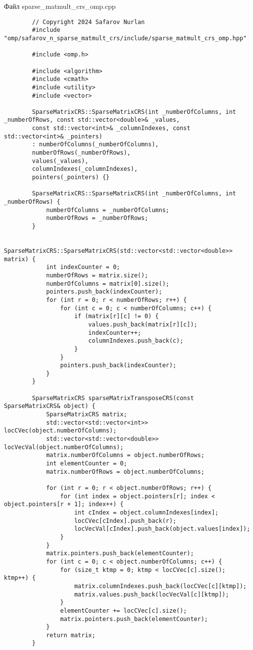 \documentclass[a4paper, 14pt]{article}
\begin{document}
	Файл sparse\_matmult\_crs\_omp.cpp
	\begin{verbatim}
		// Copyright 2024 Safarov Nurlan
		#include "omp/safarov_n_sparse_matmult_crs/include/sparse_matmult_crs_omp.hpp"
		
		#include <omp.h>
		
		#include <algorithm>
		#include <cmath>
		#include <utility>
		#include <vector>
		
		SparseMatrixCRS::SparseMatrixCRS(int _numberOfColumns, int _numberOfRows, const std::vector<double>& _values,
		const std::vector<int>& _columnIndexes, const std::vector<int>& _pointers)
		: numberOfColumns(_numberOfColumns),
		numberOfRows(_numberOfRows),
		values(_values),
		columnIndexes(_columnIndexes),
		pointers(_pointers) {}
		
		SparseMatrixCRS::SparseMatrixCRS(int _numberOfColumns, int _numberOfRows) {
			numberOfColumns = _numberOfColumns;
			numberOfRows = _numberOfRows;
		}
		
		SparseMatrixCRS::SparseMatrixCRS(std::vector<std::vector<double>> matrix) {
			int indexCounter = 0;
			numberOfRows = matrix.size();
			numberOfColumns = matrix[0].size();
			pointers.push_back(indexCounter);
			for (int r = 0; r < numberOfRows; r++) {
				for (int c = 0; c < numberOfColumns; c++) {
					if (matrix[r][c] != 0) {
						values.push_back(matrix[r][c]);
						indexCounter++;
						columnIndexes.push_back(c);
					}
				}
				pointers.push_back(indexCounter);
			}
		}
		
		SparseMatrixCRS sparseMatrixTransposeCRS(const SparseMatrixCRS& object) {
			SparseMatrixCRS matrix;
			std::vector<std::vector<int>> locCVec(object.numberOfColumns);
			std::vector<std::vector<double>> locVecVal(object.numberOfColumns);
			matrix.numberOfColumns = object.numberOfRows;
			int elementCounter = 0;
			matrix.numberOfRows = object.numberOfColumns;
			
			for (int r = 0; r < object.numberOfRows; r++) {
				for (int index = object.pointers[r]; index < object.pointers[r + 1]; index++) {
					int cIndex = object.columnIndexes[index];
					locCVec[cIndex].push_back(r);
					locVecVal[cIndex].push_back(object.values[index]);
				}
			}
			matrix.pointers.push_back(elementCounter);
			for (int c = 0; c < object.numberOfColumns; c++) {
				for (size_t ktmp = 0; ktmp < locCVec[c].size(); ktmp++) {
					matrix.columnIndexes.push_back(locCVec[c][ktmp]);
					matrix.values.push_back(locVecVal[c][ktmp]);
				}
				elementCounter += locCVec[c].size();
				matrix.pointers.push_back(elementCounter);
			}
			return matrix;
		}
		

\end{verbatim}
\end{document}
